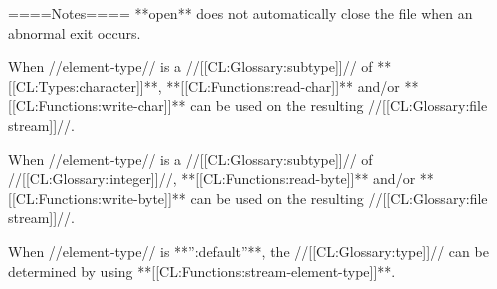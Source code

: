 ====Notes====
**open** does not automatically close the file when an abnormal exit occurs.

When //element-type// is a //[[CL:Glossary:subtype]]// of **[[CL:Types:character]]**, **[[CL:Functions:read-char]]** and/or **[[CL:Functions:write-char]]** can be used on the resulting //[[CL:Glossary:file stream]]//.

When //element-type// is a //[[CL:Glossary:subtype]]// of //[[CL:Glossary:integer]]//, **[[CL:Functions:read-byte]]** and/or **[[CL:Functions:write-byte]]** can be used on the resulting //[[CL:Glossary:file stream]]//.

When //element-type// is **'':default''**, the //[[CL:Glossary:type]]// can be determined by using **[[CL:Functions:stream-element-type]]**.

       

